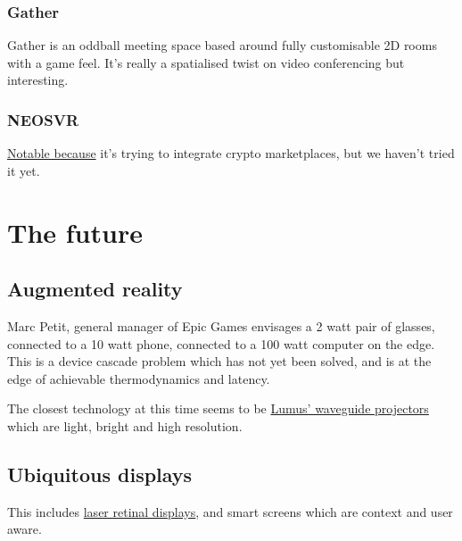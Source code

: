 \subsubsection{Gather}
Gather is an oddball meeting space based around fully customisable 2D rooms with a game feel. It's really a spatialised twist on video conferencing but interesting.  
\subsubsection{NEOSVR}
\href{https://neos.com/}{Notable because} it's trying to integrate crypto marketplaces, but we haven't tried it yet.
\section{The future}
\subsection{Augmented reality}
Marc Petit, general manager of Epic Games envisages a 2 watt pair of glasses, connected to a 10 watt phone, connected to a 100 watt computer on the edge. This is a device cascade problem which has not yet been solved, and is at the edge of achievable thermodynamics and latency.\par
The closest technology at this time seems to be \href{https://lumusvision.com/}{Lumus' waveguide projectors} which are light, bright and high resolution. 
\subsection{Ubiquitous displays}
This includes \href{https://skarredghost.com/2022/06/28/mojo-vision-contact-tested-eye/}{laser retinal displays}, and smart screens which are context and user aware.
